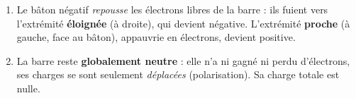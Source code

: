 \documentclass[11pt,a4paper]{article}
\begin{document}
\begin{corrige}
\begin{enumerate}[label=\alph*)]
  \item Le bâton négatif \emph{repousse} les électrons libres de la barre : ils fuient vers
        l'extrémité \textbf{éloignée} (à droite), qui devient négative. L'extrémité \textbf{proche}
        (à gauche, face au bâton), appauvrie en électrons, devient positive.
  \item La barre reste \textbf{globalement neutre} : elle n'a ni gagné ni perdu d'électrons, ses
        charges se sont seulement \emph{déplacées} (polarisation). Sa charge totale est nulle.
\end{enumerate}
\end{corrige}
\end{document}
